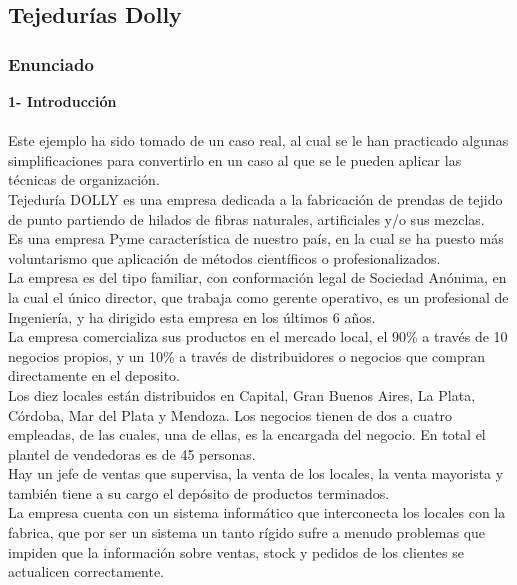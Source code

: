 \documentclass[a4paper,10pt,titlepage]{article}
\begin{document}


\newpage
\subsection{Tejedur\'ias Dolly}

\vspace{0.5cm}

  \subsubsection{Enunciado}
	\vspace{0.5cm}
	 \textbf{1- Introducci\'on}\\\\
		\indent Este ejemplo ha sido tomado de un caso real, al cual se le han practicado algunas simplificaciones para convertirlo en un caso al que se le pueden aplicar las t\'ecnicas de organizaci\'on.\\
		\indent Tejedur\'ia DOLLY es una empresa dedicada a la fabricaci\'on de prendas de tejido de punto partiendo de hilados de fibras naturales, artificiales y/o sus mezclas.\\
		\indent Es una empresa Pyme caracter\'istica de nuestro pa\'is, en la cual se ha puesto m\'as voluntarismo que aplicaci\'on de m\'etodos cient\'ificos o profesionalizados.\\
		\indent La empresa es del tipo familiar, con conformaci\'on legal de Sociedad An\'onima, en la cual el \'unico director, que trabaja como gerente operativo, es un profesional de Ingenier\'ia, y ha dirigido esta empresa en los \'ultimos 6 años.\\
		\indent La empresa comercializa sus productos en el mercado local, el 90\% a trav\'es de 10 negocios propios, y un 10\% a trav\'es de distribuidores o negocios que compran directamente en el deposito.\\
		\indent Los diez locales est\'an distribuidos en Capital, Gran Buenos Aires, La Plata, C\'ordoba, Mar del Plata y Mendoza. Los negocios tienen de dos a cuatro empleadas, de las cuales, una de ellas, es la encargada del negocio. En total el plantel de vendedoras es de 45 personas.\\
		\indent Hay un jefe de ventas que supervisa, la venta de los locales, la venta mayorista y tambi\'en tiene a su cargo el dep\'osito de productos terminados.\\
		\indent La empresa cuenta con un sistema inform\'atico que interconecta los locales con la fabrica, que por ser un sistema un tanto r\'igido sufre a menudo problemas que impiden que la informaci\'on sobre ventas, stock y pedidos de los clientes se actualicen correctamente.\\
\end{document}

